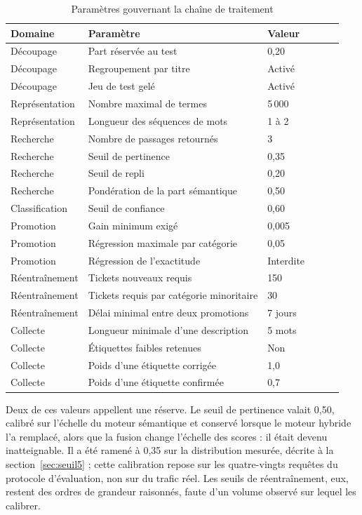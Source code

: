 \begin{table}[!htbp]
\centering
\styletableau
\caption{Paramètres gouvernant la chaîne de traitement}
\label{tab:parametres}
\begin{tabular}{|Bp{3.2cm}|Lp{5.2cm}|Cp{2.4cm}|}
\hline
{}
\textbf{Domaine} & \textbf{Paramètre} & \textbf{Valeur} \\
\hline
Découpage & Part réservée au test & 0,20 \\
\hline
Découpage & Regroupement par titre & Activé \\
\hline
Découpage & Jeu de test gelé & Activé \\
\hline
Représentation & Nombre maximal de termes & 5\,000 \\
\hline
Représentation & Longueur des séquences de mots & 1 à 2 \\
\hline
Recherche & Nombre de passages retournés & 3 \\
\hline
Recherche & Seuil de pertinence & 0,35 \\
\hline
Recherche & Seuil de repli & 0,20 \\
\hline
Recherche & Pondération de la part sémantique & 0,50 \\
\hline
Classification & Seuil de confiance & 0,60 \\
\hline
Promotion & Gain minimum exigé & 0,005 \\
\hline
Promotion & Régression maximale par catégorie & 0,05 \\
\hline
Promotion & Régression de l'exactitude & Interdite \\
\hline
Réentraînement & Tickets nouveaux requis & 150 \\
\hline
Réentraînement & Tickets requis par catégorie minoritaire & 30 \\
\hline
Réentraînement & Délai minimal entre deux promotions & 7 jours \\
\hline
Collecte & Longueur minimale d'une description & 5 mots \\
\hline
Collecte & Étiquettes faibles retenues & Non \\
\hline
Collecte & Poids d'une étiquette corrigée & 1,0 \\
\hline
Collecte & Poids d'une étiquette confirmée & 0,7 \\
\hline
\end{tabular}
\end{table}

Deux de ces valeurs appellent une réserve. Le seuil de pertinence valait 0,50, calibré sur l'échelle
du moteur sémantique et conservé lorsque le moteur hybride l'a remplacé, alors que la fusion change
l'échelle des scores : il était devenu inatteignable. Il a été ramené à 0,35 sur la distribution
mesurée, décrite à la section~\ref{sec:seuil5} ; cette calibration repose sur les quatre-vingts
requêtes du protocole d'évaluation, non sur du trafic réel. Les seuils de réentraînement, eux,
restent des ordres de grandeur raisonnés, faute d'un volume observé sur lequel les calibrer.

